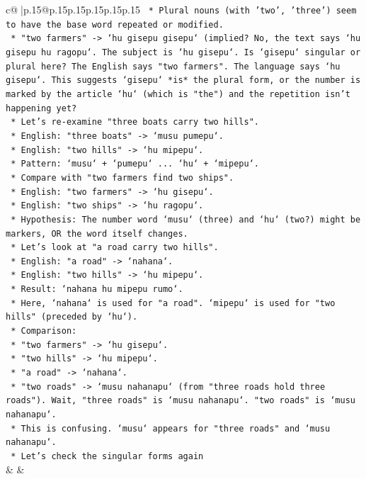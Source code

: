 \documentclass{article}
\begin{document}
{\begin{supertabular}{c@{$\;$}|p{.15\linewidth}@{}p{.15\linewidth}p{.15\linewidth}p{.15\linewidth}p{.15\linewidth}p{.15\linewidth}}
{{{\texttt{    *   Plural nouns (with 'two', 'three') seem to have the base word repeated or modified.} \\
\texttt{        *   "two farmers" {-}> `hu gisepu gisepu` (implied? No, the text says `hu gisepu hu ragopu`. The subject is `hu gisepu`. Is `gisepu` singular or plural here? The English says "two farmers". The language says `hu gisepu`. This suggests `gisepu` *is* the plural form, or the number is marked by the article `hu` (which is "the") and the repetition isn't happening yet?} \\
\texttt{        *   Let's re{-}examine "three boats carry two hills".} \\
\texttt{            *   English: "three boats" {-}> `musu pumepu`.} \\
\texttt{            *   English: "two hills" {-}> `hu mipepu`.} \\
\texttt{            *   Pattern: `musu` + `pumepu` ... `hu` + `mipepu`.} \\
\texttt{        *   Compare with "two farmers find two ships".} \\
\texttt{            *   English: "two farmers" {-}> `hu gisepu`.} \\
\texttt{            *   English: "two ships" {-}> `hu ragopu`.} \\
\texttt{        *   Hypothesis: The number word `musu` (three) and `hu` (two?) might be markers, OR the word itself changes.} \\
\texttt{        *   Let's look at "a road carry two hills".} \\
\texttt{            *   English: "a road" {-}> `nahana`.} \\
\texttt{            *   English: "two hills" {-}> `hu mipepu`.} \\
\texttt{            *   Result: `nahana hu mipepu rumo`.} \\
\texttt{            *   Here, `nahana` is used for "a road". `mipepu` is used for "two hills" (preceded by `hu`).} \\
\texttt{        *   Comparison:} \\
\texttt{            *   "two farmers" {-}> `hu gisepu`.} \\
\texttt{            *   "two hills" {-}> `hu mipepu`.} \\
\texttt{            *   "a road" {-}> `nahana`.} \\
\texttt{            *   "two roads" {-}> `musu nahanapu` (from "three roads hold three roads"). Wait, "three roads" is `musu nahanapu`. "two roads" is `musu nahanapu`.} \\
\texttt{            *   This is confusing. `musu` appears for "three roads" and `musu nahanapu`.} \\
\texttt{            *   Let's check the singular forms again} \\
            }
        }
    }
    & & \\ \\


\end{supertabular}}
\end{document}
